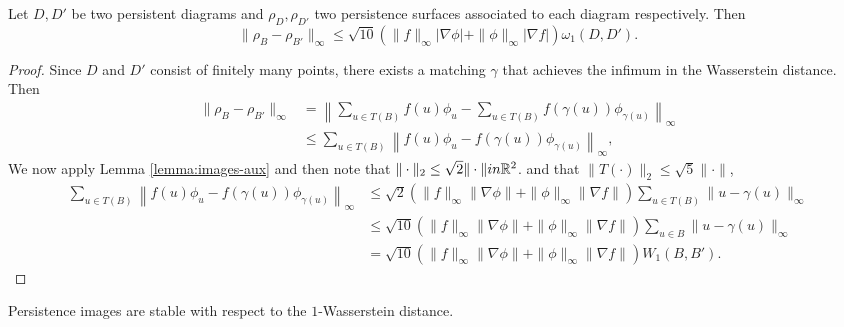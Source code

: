\begin{theorem} \label{theorem:images-1}
    Let $ D, D' $ be two persistent diagrams and $ \rho_D, \rho_{D'} $ two  persistence surfaces associated to each diagram respectively. Then
    \begin{equation}
        \| \rho_B - \rho_{B'} \|_\infty \leq \sqrt{10} (\|f\|_\infty |\nabla \phi | + \|\phi\|_\infty |\nabla f |) \omega_1(D, D').
    \end{equation}
\end{theorem}
\begin{proof}
    Since $D$ and $D'$ consist of finitely many points, there exists a matching $\gamma$ that achieves the infimum in the Wasserstein distance. Then
    \begin{align}
        \|\rho_B - \rho_{B'}\|_{\infty} 
        &= \left\| \sum_{u \in T(B)} f(u)\phi_u - \sum_{u \in T(B)} f(\gamma(u))\phi_{\gamma(u)} \right\|_{\infty} \\
        &\leq \sum_{u \in T(B)} \left\| f(u)\phi_u - f(\gamma(u))\phi_{\gamma(u)} \right\|_{\infty},
    \end{align}
    We now apply Lemma \ref{lemma:images-aux} and then note that $ \|\cdot \|_2 \leq \sqrt{2} \| \cdot \| in \mathbb R^2 $. and that $ \|T(\cdot) \|_2 \leq \sqrt{5} \| \cdot \| $,
    \begin{align}
        \sum_{u \in T(B)} \left\| f(u)\phi_u - f(\gamma(u))\phi_{\gamma(u)} \right\|_{\infty}
        &\leq \sqrt{2} (\|f\|_{\infty} \|\nabla \phi\| + \|\phi\|_{\infty} \|\nabla f\|) 
        \sum_{u \in T(B)} \|u - \gamma(u)\|_{\infty} \\
        &\leq \sqrt{10} (\|f\|_{\infty} \|\nabla \phi\| + \|\phi\|_{\infty} \|\nabla f\|) 
        \sum_{u \in B} \|u - \gamma(u)\|_{\infty} \\
        &= \sqrt{10} (\|f\|_{\infty} \|\nabla \phi\| + \|\phi\|_{\infty} \|\nabla f\|) W_1(B, B').
    \end{align}
\end{proof}

Persistence images are stable with respect to the $1$-Wasserstein distance.

